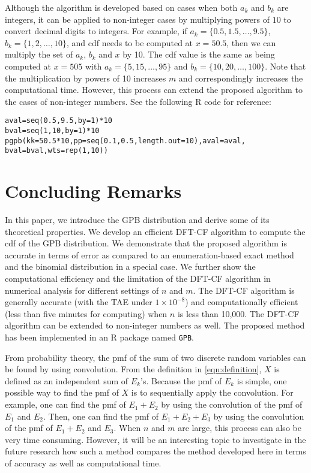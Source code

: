\documentclass[12pt]{article}
\begin{document}
Although the algorithm is developed based on cases when both $a_k$ and $b_k$ are integers, it can be applied to non-integer cases by multiplying powers of $10$ to convert decimal digits to integers. For example, if $a_k =\{0.5, 1.5, \dots, 9.5\}$, $b_k = \{1, 2, \dots, 10\}$, and cdf needs to be computed at $x=50.5$, then we can multiply the set of $a_k$, $b_k$ and $x$ by 10. The cdf value is the same as being computed at $x=505$ with $a_k = \{5, 15, \dots, 95\}$ and $b_k = \{10, 20, \dots, 100\}$. Note that the multiplication by powers of 10 increases $m$ and correspondingly increases the computational time. However, this process can extend the proposed algorithm to the cases of non-integer numbers. See the following R code for reference:
\begin{verbatim}
aval=seq(0.5,9.5,by=1)*10
bval=seq(1,10,by=1)*10
pgpb(kk=50.5*10,pp=seq(0.1,0.5,length.out=10),aval=aval,
bval=bval,wts=rep(1,10))
\end{verbatim}


\section{Concluding Remarks}\label{sec:conclusion}
In this paper, we introduce the GPB distribution and derive some of its theoretical properties. We develop an efficient DFT-CF algorithm to compute the cdf of the GPB distribution. We demonstrate that the proposed algorithm is accurate in terms of error as compared to an enumeration-based exact method and the binomial distribution in a special case. We further show the computational efficiency and the limitation of the DFT-CF algorithm in numerical analysis for different settings of $n$ and $m$. The DFT-CF algorithm is generally accurate (with the TAE under $1\times10^{-8}$) and computationally efficient (less than five minutes for computing) when $n$ is less than 10{,}000.  The DFT-CF algorithm can be extended to non-integer numbers as well. The proposed method has been implemented in an R package named \texttt{GPB}.

From probability theory, the pmf of the sum of two discrete random variables can be found by using convolution. From the definition in \eqref{eqn:definition}, $X$ is defined as an independent sum of $E_k$'s. Because the pmf of $E_k$ is simple, one possible way to find the pmf of $X$ is to sequentially apply the convolution. For example, one can find the pmf of $E_1+E_2$ by using the convolution of the pmf of $E_1$ and $E_2$. Then, one can find the pmf of $E_1+E_2+E_3$ by using the convolution of the pmf of $E_1+E_2$ and $E_3$. When $n$ and $m$ are large, this process can also be very time consuming. However, it will be an interesting topic to investigate in the future research how such a method compares the method developed here in terms of accuracy as well as computational time. 
\end{document}
